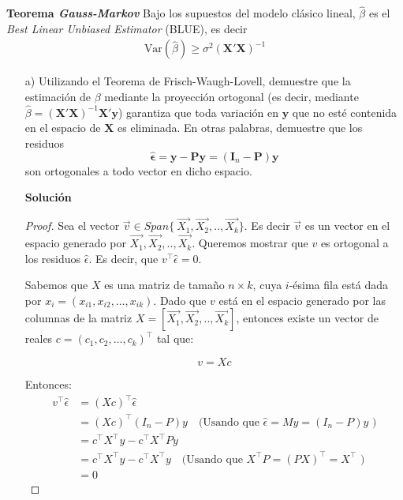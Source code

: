 \documentclass[a4paper, answers, addpoints, 11pt]{exam}
\newenvironment{solucion}{%
  \begin{mdframed}[
    backgroundcolor=blue!5,    %
    linecolor=blue!50,          %
    linewidth=2pt,              %
    leftmargin=10pt,            %
    rightmargin=8pt,           %
    topline=true,              %
    bottomline=true,            %
    roundcorner=10pt,           %
    innerleftmargin=10pt,       %
    innerrightmargin=10pt,      %
    innerbottommargin=10pt,     %
    innertopmargin=10pt         %
  ]%
  \begin{tcolorbox}[colframe=blue!50!black, colback=blue!50, coltitle=white, sharp corners=all, boxrule=1mm, width=\textwidth, halign=left, valign=center, top=0mm, bottom=0mm, left=0mm, right=0mm] \textbf{Solución} \end{tcolorbox} }{\end{mdframed}}
\begin{document}
\begin{enumerate}
\begin{mdframed}
\textbf{Teorema \textit{Gauss-Markov}}
Bajo los supuestos del modelo clásico lineal, \(\hat{\beta}\) es el \emph{Best Linear Unbiased Estimator} (BLUE), es decir
\begin{align}
   \text{Var}(\hat{\beta}) \geq \sigma^2 (\mathbf{X}' \mathbf{X})^{-1}    \tag{Gauss-Markov}
\end{align}
\end{mdframed}

\begin{itemize}
    \item[a)] Utilizando el Teorema de Frisch-Waugh-Lovell, demuestre que la estimación de \(\beta\) mediante la proyección ortogonal (es decir, mediante \(\hat{\beta} = (\mathbf{X}'\mathbf{X})^{-1}\mathbf{X}'\mathbf{y}\)) garantiza que toda variación en \(\mathbf{y}\) que no esté contenida en el espacio de \(\mathbf{X}\) es eliminada. En otras palabras, demuestre que los residuos
\[
\hat{\boldsymbol\epsilon} = \mathbf{y} - \mathbf{P}\mathbf{y} = (\mathbf{I}_n - \mathbf{P})\mathbf{y}
\]
son ortogonales a todo vector en dicho espacio.

 \begin{solucion}
  \begin{proof}
     Sea el vector \(\vec{v}  \in Span \{\ \vec{X_1}, \vec{X_2},.., \vec{X_k} \}\). Es decir $\vec{v}$ es un vector en el espacio generado por \( \vec{X_1}, \vec{X_2},.., \vec{X_k} \). Queremos mostrar que \( v \) es ortogonal a los residuos \( \hat{\epsilon} \). Es decir, que \( v^\top \hat{\epsilon} = 0 \).

Sabemos que \( X \) es una matriz de tamaño \( n \times k \), cuya \( i \)-ésima fila está dada por \( x_i = (x_{i1}, x_{i2}, \dots, x_{ik}) \).
Dado que \( v \) está en el espacio generado por las columnas de la matriz \( X = [\vec{X_1}, \vec{X_2},.., \vec{X_k}] \), entonces existe un vector de reales \( c = (c_1, c_2, \dots, c_k)^\top \) tal que:

\[
v = X c
\]

Entonces:
\begin{align*}
    v^\top \hat{\epsilon} & = (X c)^\top \hat{\epsilon}\\
    & = (Xc)^\top (I_n - P) y \quad \text{(Usando que $\hat{\epsilon}=My=(I_n - P)y$ )} \\
     & = c^\top X^\top y - c^\top X^\top P y \\
                       &= c^\top X^\top y - c^\top X^\top y \quad \text{(Usando que $X^\top P=(P X)^\top=X^\top$ )}\\
                       &= 0
\end{align*}


\end{proof}
\end{solucion}
\end{itemize}
\end{enumerate}
\end{document}
